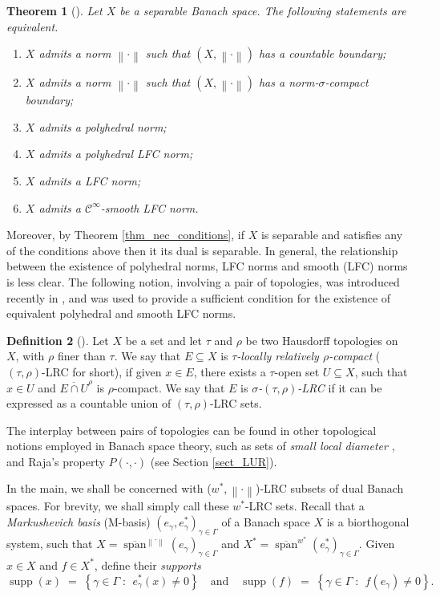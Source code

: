 \documentclass[12pt,reqno]{amsart}
\newcommand{\cl}[1]{\ensuremath{\overline{{#1}}}}
\newcommand{\ndot}{\ensuremath{\left\|\cdot\right\|}}
\newcommand{\set}[2]{\ensuremath{\left\{{#1}\;:\;\,{#2}\right\}}}
\DeclareMathOperator{\aspan}{span}
\DeclareMathOperator{\supp}{supp}
\newtheorem{thm}{Theorem}[section]
\theoremstyle{definition}
\newtheorem{defn}[thm]{Definition}
\begin{document}
\begin{thm}[\cite{fonf:90,hajek:95}]\label{sepequiv} Let $X$ be a separable Banach space. The following
statements are equivalent.
\begin{enumerate}
\item $X$ admits a norm $\ndot$ such that $(X,\ndot)$ has a countable boundary;
\item $X$ admits a norm $\ndot$ such that $(X,\ndot)$ has a norm-$\sigma$-compact boundary;
\item $X$ admits a polyhedral norm;
\item $X$ admits a polyhedral LFC norm;
\item $X$ admits a LFC norm;
\item $X$ admits a $\mathscr{C}^\infty$-smooth LFC norm.
\end{enumerate}
\end{thm}

Moreover, by Theorem \ref{thm_nec_conditions}, if $X$ is separable and satisfies any of the conditions above then it its dual is separable. In general, the relationship between the existence of polyhedral norms, LFC norms and smooth (LFC) norms is less clear. The following notion, involving a pair of topologies, was introduced recently in \cite{fpst:14}, and was used to provide a sufficient condition for the existence of equivalent polyhedral and smooth LFC norms.

\begin{defn}[{\cite[Definition 11]{fpst:14}}]\label{lrc}
Let $X$ be a set and let $\tau$ and $\rho$ be two Hausdorff topologies on $X$, with $\rho$ finer than $\tau$. We say that $E \subseteq X$ is {\em $\tau$-locally relatively $\rho$-compact} ($(\tau,\rho)$-LRC for short), if given $x \in E$, there exists a $\tau$-open set $U \subseteq X$, such that $x \in U$ and $\cl{E \cap U}^{\rho}$ is $\rho$-compact. We say that $E$ is {\em $\sigma$-$(\tau,\rho)$-LRC} if it can be expressed as a countable union of $(\tau,\rho)$-LRC sets.
\end{defn}

The interplay between pairs of topologies can be found in other topological notions employed in Banach space theory, such as sets of {\em small local diameter} \cite[p.~162]{jnr:92}, and Raja's property $P(\cdot,\cdot)$ (see Section \ref{sect_LUR}).

In the main, we shall be concerned with ($w^*,\ndot$)-LRC subsets of dual Banach spaces. For brevity, we shall simply call these $w^*$-LRC sets. Recall that a {\em Markushevich basis} (M-basis) $(e_\gamma,e_\gamma^*)_{\gamma \in \Gamma}$ of a Banach space $X$ is a biorthogonal system, such that $X=\cl{\aspan}^{\ndot}(e_\gamma)_{\gamma \in \Gamma}$ and $X^* = \cl{\aspan}^{w^*}(e^*_\gamma)_{\gamma \in \Gamma}$. Given $x \in X$ and $f \in X^*$, define their {\em supports}
\[
\supp(x) \;=\; \set{\gamma \in \Gamma}{e^*_\gamma(x) \neq 0}\quad\text{and}\quad \supp(f) \;=\; \set{\gamma \in \Gamma}{f(e_\gamma) \neq 0}.
\]
\end{document}
